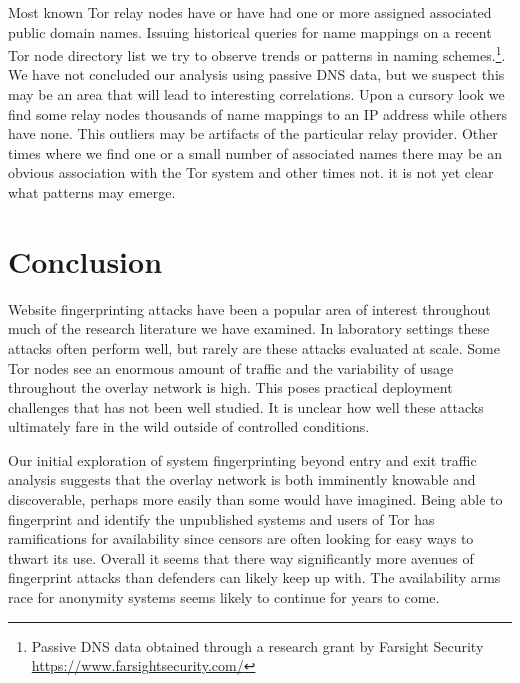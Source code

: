 \documentclass[sigconf]{acmart}
\begin{document}
Most known Tor relay nodes have or have had one or more assigned
associated public domain names.  Issuing historical queries for name
mappings on a recent Tor node directory list we try to observe trends or
patterns in naming schemes.\footnote{Passive DNS data obtained through a
research grant by Farsight Security
\url{https://www.farsightsecurity.com/}}.  We have not concluded our
analysis using passive DNS data, but we suspect this may be an area that
will lead to interesting correlations.  Upon a cursory look we find some
relay nodes thousands of name mappings to an IP address while others
have none.  This outliers may be artifacts of the particular relay
provider.  Other times where we find one or a small number of associated
names there may be an obvious association with the Tor system and other
times not.  it is not yet clear what patterns may emerge.

\section{Conclusion}

Website fingerprinting attacks have been a popular area of interest
throughout much of the research literature we have examined.
In laboratory settings these attacks often perform well, but rarely are
these attacks evaluated at scale.  Some Tor nodes see an enormous amount
of traffic and the variability of usage throughout the overlay network
is high.  This poses practical deployment challenges that has not been
well studied.  It is unclear how well these attacks ultimately fare in
the wild outside of controlled conditions.

Our initial exploration of system fingerprinting beyond entry and exit
traffic analysis suggests that the overlay network is both imminently
knowable and discoverable, perhaps more easily than some would have
imagined.  Being able to fingerprint and identify the unpublished
systems and users of Tor has ramifications for availability since
censors are often looking for easy ways to thwart its use.  Overall it
seems that there way significantly more avenues of fingerprint attacks
than defenders can likely keep up with.  The availability arms race for
anonymity systems seems likely to continue for years to come.


\end{document}
